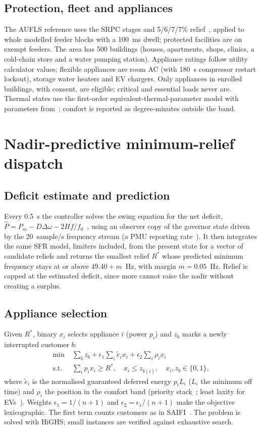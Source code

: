 \documentclass[conference]{IEEEtran}
\begin{document}
\subsection{Protection, fleet and appliances}
The AUFLS reference uses the SRPC stages and 5/6/7/7\% relief~\cite{srpc2024}, applied to whole modelled feeder blocks with a 100~ms dwell; protected facilities are on exempt feeders. The area has 500 buildings (houses, apartments, shops, clinics, a cold-chain store and a water pumping station). Appliance ratings follow utility calculator values; flexible appliances are room AC (with 180~s compressor restart lockout), storage water heaters and EV chargers. Only appliances in enrolled buildings, with consent, are eligible; critical and essential loads never are. Thermal states use the first-order equivalent-thermal-parameter model with parameters from~\cite{mathieu2013}; comfort is reported as degree-minutes outside the band.

\section{Nadir-predictive minimum-relief dispatch}
\subsection{Deficit estimate and prediction}
Every 0.5~s the controller solves the swing equation for the net deficit, $\hat{P}=P_m-D\Delta\omega-2H\dot{f}/f_0$~\cite{kundur1994,inoue1997,terzija2006}, using an observer copy of the governor state driven by the 20~sample/s frequency stream (a PMU reporting rate~\cite{c37118}). It then integrates the same SFR model, limiters included, from the present state for a vector of candidate reliefs and returns the smallest relief $R^\ast$ whose predicted minimum frequency stays at or above $49.40+m$~Hz, with margin $m=0.05$~Hz. Relief is capped at the estimated deficit, since more cannot raise the nadir without creating a surplus.

\subsection{Appliance selection}
Given $R^\ast$, binary $x_i$ selects appliance $i$ (power $p_i$) and $z_b$ marks a newly interrupted customer $b$:
\begin{align}
\min\; & \textstyle\sum_b z_b + \epsilon_1\sum_i \tilde{e}_i x_i + \epsilon_2 \sum_i \rho_i x_i\\
\text{s.t.}\; & \textstyle\sum_i p_i x_i \ge R^\ast,\quad x_i \le z_{b(i)},\quad x_i,z_b\in\{0,1\},
\end{align}
where $\tilde{e}_i$ is the normalised guaranteed deferred energy $p_iL_i$ ($L_i$ the minimum off time) and $\rho_i$ the position in the comfort band (priority stack~\cite{lu2012}; least laxity for EVs~\cite{xu2016}). Weights $\epsilon_1=1/(n+1)$ and $\epsilon_2=\epsilon_1/(n+1)$ make the objective lexicographic. The first term counts customers as in SAIFI~\cite{ieee1366}. The problem is solved with HiGHS; small instances are verified against exhaustive search.
\end{document}
